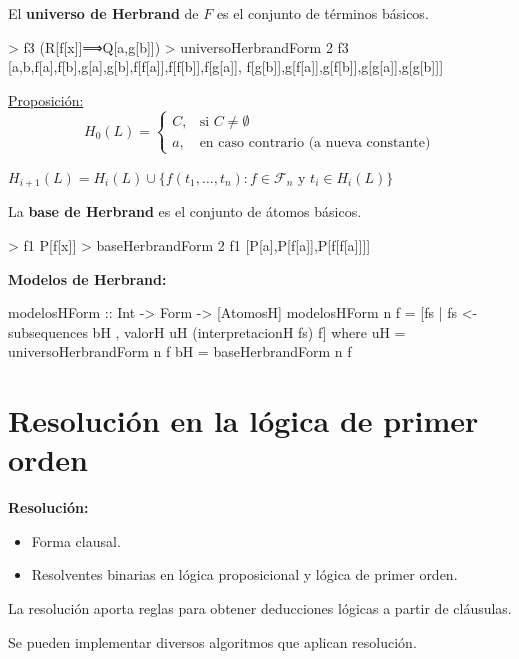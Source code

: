 \documentclass{beamer}
\begin{document}
\begin{frame}[fragile]
  El \textbf{universo de Herbrand} de $F$ es el conjunto de términos básicos.
\begin{sesion}
> f3
(R[f[x]]⟹Q[a,g[b]])
> universoHerbrandForm 2 f3
[a,b,f[a],f[b],g[a],g[b],f[f[a]],f[f[b]],f[g[a]],
f[g[b]],g[f[a]],g[f[b]],g[g[a]],g[g[b]]]
\end{sesion}

\underline{Proposición:}
  \begin{equation*}
    H_0(L)= \left\{
      \begin{array}{ll}
        C, & \text{si } C \neq \emptyset \\
        {a}, & \text{en caso contrario (a nueva constante)} 
      \end{array} \right.
  \end{equation*}
  
  $H_{i+1}(L) = H_i(L)\cup \{f(t_1,\dots,t_n):f\in \mathcal{F}_n \text{ y } t_i\in H_i (L)\}$
\end{frame}

\begin{frame}[fragile]
La \textbf{base de Herbrand} es el conjunto de átomos básicos.

\begin{sesion}
> f1
P[f[x]]
> baseHerbrandForm 2 f1
[P[a],P[f[a]],P[f[f[a]]]]  
\end{sesion}
\end{frame}

\begin{frame}[fragile]
  \textbf{Modelos de Herbrand:}

  \vspace{5mm}
\begin{code}
modelosHForm :: Int -> Form -> [AtomosH]
modelosHForm n f =
 [fs | fs <- subsequences bH
      , valorH uH (interpretacionH fs) f]
  where uH = universoHerbrandForm n f
        bH = baseHerbrandForm n f
\end{code}  
  
\end{frame}

\section{Resolución en la lógica de primer orden}
\begin{frame}
  \textbf{Resolución:}

  \begin{itemize}
  \item Forma clausal.
  \item Resolventes binarias en lógica proposicional y lógica de primer orden.
  \end{itemize}
  La resolución aporta reglas para obtener deducciones lógicas a partir de cláusulas.

  Se pueden implementar diversos algoritmos que aplican resolución.
\end{frame}
\end{document}
